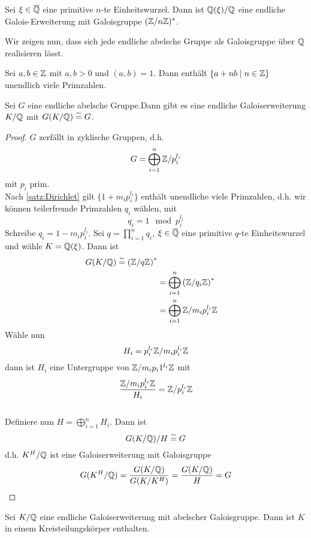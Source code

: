 	
	\begin{kor}
		Sei $\xi\in\overline{\mathbb{Q}}$ eine primitive $n$-te Einheitswurzel. Dann ist $\mathbb{Q}(\xi)/\mathbb{Q}$ eine endliche Galois-Erweiterung mit Galoisgruppe $(\mathbb{Z}/n\mathbb{Z})^*$.
	\end{kor}
	
	Wir zeigen nun, dass sich jede endliche abelsche Gruppe als Galoisgruppe über $\mathbb{Q}$ realisieren lässt.
	
	\begin{theorem}[Dirichlet]\label{satz:Dirichlet}
		Sei $a,b\in\mathbb{Z}$ mit $a,b>0$ und $(a,b)=1$. Dann enthält $\{a+nb\mid n\in\mathbb{Z}\}$ unendlich viele Primzahlen.
	\end{theorem}

	\begin{theorem}
		Sei $G$ eine endliche abelsche Gruppe.Dann gibt es eine endliche Galoiserweiterung $K/\mathbb{Q}$ mit $G(K/\mathbb{Q})\overset{\sim}{=} G$.
	\end{theorem}
	\begin{proof}
		$G$ zerfällt in zyklische Gruppen, d.h.\[G=\bigoplus_{i=1}^n \mathbb{Z}/p_i^{l_i}\]
		mit $p_i$ prim.\\
		Nach \ref{satz:Dirichlet} gilt $\{1+m_ip_i^{l_i}\}$ enthält unendliche viele Primzahlen, d.h. wir können  teilerfremde Primzahlen $q_i$ wählen, mit
		\[q_i=1\mod p_i^{l_i}\]
		Schreibe $q_i=1-m_ip_i^{l_i}$. Sei $q=\prod_{i=1}^n q_i$, $\xi\in\overline{\mathbb{Q}}$ eine primitive $q$-te Einheitswurzel und wähle $K=\mathbb{Q}(\xi)$. Dann ist
		\begin{align*}
		G(K/\mathbb{Q})\overset{\sim}{=} \left(\mathbb{Z}/q\mathbb{Z} \right)^*\\
		&=\bigoplus_{i=1}^n\left(\mathbb{Z}/q_i\mathbb{Z}\right)^*\\
		&=\bigoplus_{i=1}^n\mathbb{Z}/m_ip_i^{l_i}\mathbb{Z}\\
		\end{align*}
		Wähle nun
		\[H_i=p_i^{l_i}\mathbb{Z}/m_ip_i^{l_i}\mathbb{Z}\]
		dann ist $H_i$ eine Untergruppe von $\mathbb{Z}/m_ip_i1^{l_i}\mathbb{Z}$ mit
		\[\frac{\mathbb{Z}/m_ip_i^{l_i}\mathbb{Z}}{H_i}=\mathbb{Z}/p_i^{l_i}\mathbb{Z}\]
		\\
		Definiere nun $H=\bigoplus_{i=1}^n H_i$. Dann ist
		\[G(K/\mathbb{Q})/H\overset{\sim}{=} G\]
		d.h. $K^H/\mathbb{Q}$ ist eine Galoiserweiterung mit Galoisgruppe
		\[G(K^H/\mathbb{Q})=\frac{G(K/\mathbb{Q})}{G(K/K^H)}=\frac{G(K/\mathbb{Q})}{H}=G\] 
	\end{proof}


	\begin{theorem}
		Sei $K/\mathbb{Q}$ eine endliche Galoiserweiterung mit abelscher Galoisgruppe. Dann ist $K$ in einem Kreisteilungskörper enthalten.
	\end{theorem}

